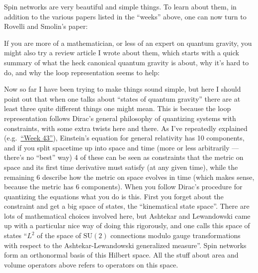 \documentclass{article}
\def\tightlist{}
\renewcommand{\texttt}[1]{%
  \begingroup
  \ttfamily
  \begingroup\lccode`~=`/\lowercase{\endgroup\def~}{/\discretionary{}{}{}}%
  \begingroup\lccode`~=`[\lowercase{\endgroup\def~}{[\discretionary{}{}{}}%
  \begingroup\lccode`~=`.\lowercase{\endgroup\def~}{.\discretionary{}{}{}}%
  \catcode`/=\active\catcode`[=\active\catcode`.=\active
  \scantokens{#1\noexpand}%
  \endgroup
}
\begin{document}
Spin networks are very beautiful and simple things. To learn about them,
in addition to the various papers listed in the ``weeks'' above, one can
now turn to Rovelli and Smolin's paper:


If you are more of a mathematician, or less of an expert on quantum
gravity, you might also try a review article I wrote about them, which
starts with a quick summary of what the heck canonical quantum gravity
is about, why it's hard to do, and why the loop representation seems to
help:


Now so far I have been trying to make things sound simple, but here I
should point out that when one talks about ``states of quantum gravity''
there are at least three quite different things one might mean. This is
because the loop representation follows Dirac's general philosophy of
quantizing systems with constraints, with some extra twists here and
there. As I've repeatedly explained
(e.g.~\protect\hyperlink{week43}{``Week 43''}), Einstein's equation for
general relativity has 10 components, and if you split spacetime up into
space and time (more or less arbitrarily --- there's no ``best'' way) 4
of these can be seen as constraints that the metric on space and its
first time derivative must satisfy (at any given time), while the
remaining 6 describe how the metric on space evolves in time (which
makes sense, because the metric has 6 components). When you follow
Dirac's procedure for quantizing the equations what you do is this.
First you forget about the constraint and get a big space of states, the
``kinematical state space''. There are lots of mathematical choices
involved here, but Ashtekar and Lewandowski came up with a particular
nice way of doing this rigorously, and one calls this space of states
``\(L^2\) of the space of \(\mathrm{SU}(2)\) connections modulo gauge
transformations with respect to the Ashtekar-Lewandowski generalized
measure''. Spin networks form an orthonormal basis of this Hilbert
space. All the stuff about area and volume operators above refers to
operators on this space.
\end{document}
